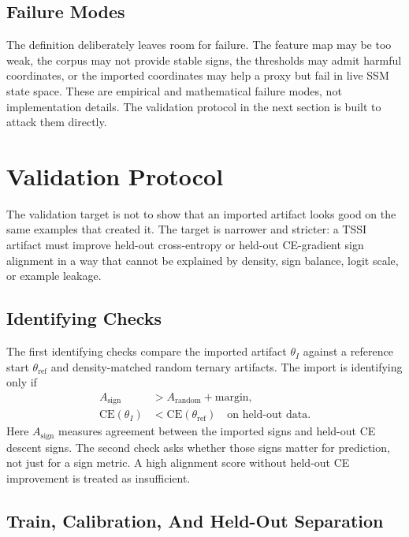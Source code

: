 \documentclass{article}
\begin{document}
\subsection{Failure Modes}

The definition deliberately leaves room for failure. The feature map may be too
weak, the corpus may not provide stable signs, the thresholds may admit harmful
coordinates, or the imported coordinates may help a proxy but fail in live SSM
state space. These are empirical and mathematical failure modes, not
implementation details. The validation protocol in the next section is built
to attack them directly.

\section{Validation Protocol}

The validation target is not to show that an imported artifact looks good on
the same examples that created it. The target is narrower and stricter: a TSSI
artifact must improve held-out cross-entropy or held-out CE-gradient sign
alignment in a way that cannot be explained by density, sign balance, logit
scale, or example leakage.

\subsection{Identifying Checks}

The first identifying checks compare the imported artifact $\theta_I$ against a
reference start $\theta_{\mathrm{ref}}$ and density-matched random ternary
artifacts. The import is identifying only if
\begin{align}
  A_{\mathrm{sign}} &> A_{\mathrm{random}} + \mathrm{margin}, \\
  \mathrm{CE}(\theta_I) &< \mathrm{CE}(\theta_{\mathrm{ref}})
  \quad \text{on held-out data}.
\end{align}
Here $A_{\mathrm{sign}}$ measures agreement between the imported signs and
held-out CE descent signs. The second check asks whether those signs matter for
prediction, not just for a sign metric. A high alignment score without held-out
CE improvement is treated as insufficient.

\subsection{Train, Calibration, And Held-Out Separation}
\end{document}
